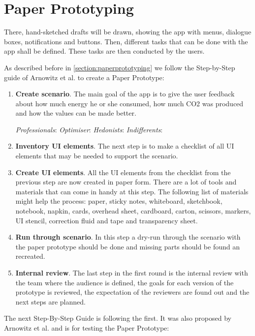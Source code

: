\section{Paper Prototyping}
There, hand-sketched drafts will be drawn, showing the app with menus, dialogue boxes, notifications and buttons. Then, different tasks that can be done with the app shall be defined. These tasks are then conducted by the users.

As described before in \ref{section:paperprototyping} we follow the Step-by-Step guide of Arnowitz et al. \cite{arnowitz2010effective} to create a Paper Prototype:


\begin{enumerate}
	\item \textbf{Create scenario}. The main goal of the app is to give the user feedback about how much energy he or she consumed, how much CO2 was produced and how the values can be made better.
	
	\textit{Professionals}:
	\textit{Optimiser}:
	\textit{Hedonists}:
	\textit{Indifferents}:
	
	
	
	\item \textbf{Inventory UI elements}. The next step is to make a checklist of all UI elements that may be needed to support the scenario.
	\item \textbf{Create UI elements}. All the UI elements from the checklist from the previous step are now created in paper form. There are a lot of tools and materials that can come in handy at this step. The following list of materials might help the process: paper, sticky notes,
	whiteboard, sketchbook, notebook, napkin, cards, overhead sheet, cardboard, carton, scissors, markers, UI stencil, correction fluid and tape and transparency sheet. 
	\item \textbf{Run through scenario}. In this step a dry-run through the scenario with the paper prototype should be done and missing parts should be found an recreated.
	\item \textbf{Internal review}. The last step in the first round is the internal review with the team where the audience is defined, the goals for each version of the prototype is reviewed, the expectation of the reviewers are found out and the next steps are planned.
\end{enumerate}

The next Step-By-Step Guide is following the first. It was also proposed by Arnowitz et al. \cite{arnowitz2010effective} and is for testing the Paper Prototype:

